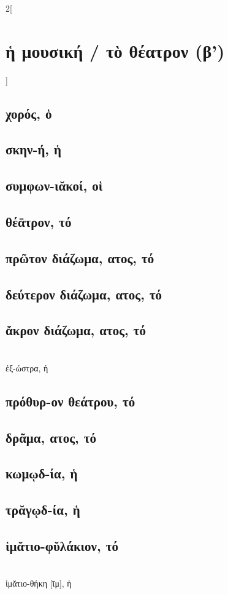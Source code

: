 \documentclass{book}
\begin{document}
\begin{multicols}{2}[\section{ἡ μουσική / τὸ θέατρον (β')}] 
\subsection{χορός, ὁ}
\subsection{σκην-ή, ἡ}
\subsection{συμφων-ιᾰκοί, οἱ}
\subsection{θέᾱτρον, τό}
\subsection{πρῶτον διάζωμα, ατος, τό}
\subsection{δεύτερον διάζωμα, ατος, τό}
\subsection{ἄκρον διάζωμα, ατος, τό}
 ~\\
ἐξ-ώστρα, ἡ
\subsection{πρόθυρ-ον θεάτρου, τό}
\subsection{δρᾶμα, ατος, τό}
\subsection{κωμῳδ-ία, ἡ}
\subsection{τρᾰγῳδ-ία, ἡ}
\subsection{ἱμᾰτιο-φῠλάκιον, τό}
 ~\\
ἱμᾰτιο-θήκη [ῑμ], ἡ
~
\end{multicols}
\end{document}
